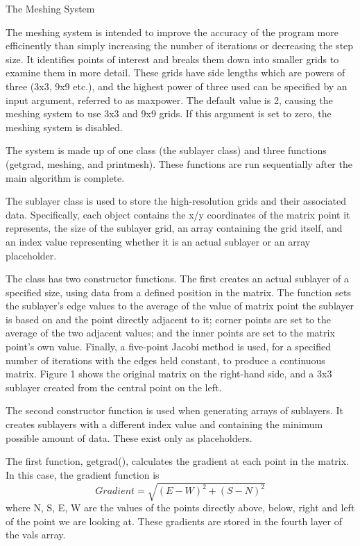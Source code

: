The Meshing System

The meshing system is intended to improve the accuracy of the program more efficinently than simply increasing the number of iterations or decreasing the step size. It identifies points of interest and breaks them down into smaller grids to examine them in more detail. These grids have side lengths which are powers of three (3x3, 9x9 etc.), and the highest power of three used can be specified by an input argument, referred to as maxpower. The default value is 2, causing the meshing system to use 3x3 and 9x9 grids. If this argument is set to zero, the meshing system is disabled.

The system is made up of one class (the sublayer class) and three functions (getgrad, meshing, and printmesh). These functions are run sequentially after the main algorithm is complete.

The sublayer class is used to store the high-resolution grids and their associated data. Specifically, each object contains the x/y coordinates of the matrix point it represents, the size of the sublayer grid, an array containing the grid itself, and an index value representing whether it is an actual sublayer or an array placeholder.

The class has two constructor functions. The first creates an actual sublayer of a specified size, using data from a defined position in the matrix. The function sets the sublayer's edge values to the average of the value of matrix point the sublayer is based on and the point directly adjacent to it; corner points are set to the average of the two adjacent values; and the inner points are set to the matrix point's own value. Finally, a five-point Jacobi method is used, for a specified number of iterations with the edges held constant, to produce a continuous matrix. Figure 1 shows the original matrix on the right-hand side, and a 3x3 sublayer created from the central point on the left.

The second constructor function is used when generating arrays of sublayers. It creates sublayers with a different index value and containing the minimum possible amount of data. These exist only as placeholders.

The first function, getgrad(), calculates the gradient at each point in the matrix. In this case, the gradient function is
\begin{equation}Gradient = \sqrt{(E - W)^2 + (S - N)^2} \end{equation}
where N, S, E, W are the values of the points directly above, below, right and left of the point we are looking at. These gradients are stored in the fourth layer of the vals array.

